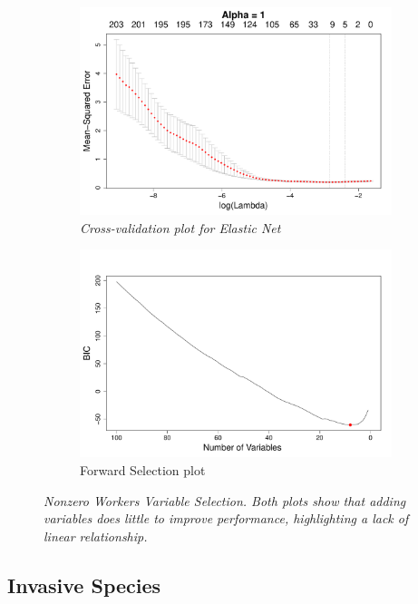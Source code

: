 \documentclass{article}
\begin{document}
\begin{figure}[h]
\begin{subfigure}[b]{0.5\textwidth}
\includegraphics[width=\textwidth]{elastic_cv_workers_nonzero.pdf}
\caption{\textsl{\small Cross-validation plot for Elastic Net}}
\end{subfigure}
\hfill
\begin{subfigure}[b]{0.5\textwidth}
\includegraphics[width=\textwidth]{forward_nvars_workers_nonzero.pdf}
\caption{Forward Selection plot}
\end{subfigure}
\caption{\textsl{\small Nonzero Workers Variable Selection. Both plots show that adding variables does little to improve performance, highlighting a lack of linear relationship.}}
\label{figure:workers_nonzero_opt}
\end{figure}

\subsection{Invasive Species}
\end{document}
